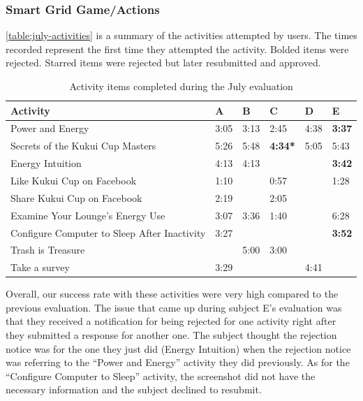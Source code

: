 \subsubsection{Smart Grid Game/Actions}

\autoref{table:july-activities} is a summary of the activities attempted by users. The times recorded represent the first time they attempted the activity. Bolded items were rejected. Starred items were rejected but later resubmitted and approved.

\begin{table}[t]
	\begin{tabular}{| l || p{1cm} | p{1cm} | p{1cm} | p{1cm} | p{1cm} |}
		\hline
		Activity & A & B & C & D & E \\
		\hline
		Power and Energy & 3:05 & 3:13 & 2:45 & 4:38 & \bf{3:37} \\
    Secrets of the Kukui Cup Masters & 5:26 & 5:48 & \bf{4:34}* & 5:05 & 5:43 \\
    Energy Intuition & 4:13 & 4:13 & & & \bf{3:42} \\
    Like Kukui Cup on Facebook & 1:10 & & 0:57 & & 1:28 \\
    Share Kukui Cup on Facebook & 2:19 & & 2:05 & & \\
    Examine Your Lounge's Energy Use & 3:07 & 3:36 & 1:40 & & 6:28 \\
    Configure Computer to Sleep After Inactivity & 3:27 & & & & \bf{3:52} \\
    Trash is Treasure & & 5:00 & 3:00 & & \\
    Take a survey & 3:29 & & & 4:41 & \\
		\hline
	\end{tabular}
	\caption{Activity items completed during the July evaluation}
	\label{table:july-activities}
\end{table}

Overall, our success rate with these activities were very high compared to the previous evaluation. The issue that came up during subject E's evaluation was that they received a notification for being rejected for one activity right after they submitted a response for another one. The subject thought the rejection notice was for the one they just did (Energy Intuition) when the rejection notice was referring to the ``Power and Energy'' activity they did previously. As for the ``Configure Computer to Sleep'' activity, the screenshot did not have the necessary information and the subject declined to resubmit.

